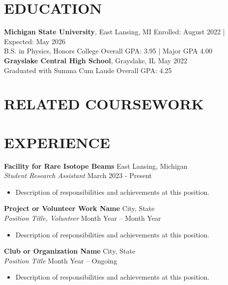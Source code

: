 \documentclass[9pt]{developercv} %
\begin{document}
\section*{EDUCATION}
\noindent
\textbf{Michigan State University}, East Lansing, MI \hfill Enrolled: August 2022 | Expected: May 2026\\ %
B.S. in Physics, Honors College \hfill Overall GPA: 3.95 | Major GPA 4.00\\ %

\textbf{Grayslake Central High School}, Grayslake, IL \hfill May 2022\\ 
Graduated with Summa Cum Laude \hfill Overall GPA: 4.25

\section*{RELATED COURSEWORK}

\section*{EXPERIENCE}
\noindent
\textbf{Facility for Rare Isotope Beams} \hfill East Lansing, Michigan\\ %
\textit{Student Research Assistant} \hfill March 2023 - Present %
\begin{itemize}
    \item Description of responsibilities and achievements at this position. %
\end{itemize}

\noindent
\textbf{Project or Volunteer Work Name} \hfill City, State\\ %
\textit{Position Title, Volunteer} \hfill Month Year – Month Year %
\begin{itemize}
    \item Description of responsibilities and achievements at this position. %
\end{itemize}

\textbf{Club or Organization Name} \hfill City, State\\ %
\textit{Position Title} \hfill Month Year – Ongoing %
\begin{itemize}
    \item Description of responsibilities and achievements at this position. %
\end{itemize}
\end{document}
